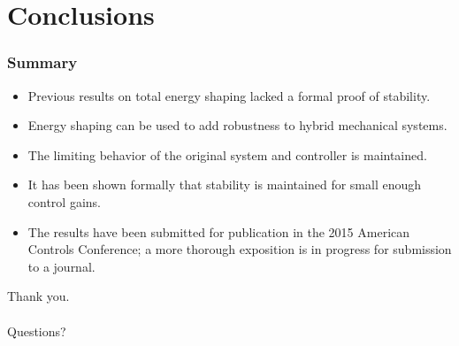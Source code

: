 \section{Conclusions}
\begin{frame}[t]
  \frametitle{Summary}
  \begin{itemize}
  \item Previous results on total energy shaping lacked a formal proof of
    stability.
  \item Energy shaping can be used to add robustness to hybrid mechanical
    systems.
  \item The limiting behavior of the original system and controller is
    maintained.
  \item It has been shown formally that stability is maintained for small enough
    control gains.
  \item The results have been submitted for publication in the 2015 American
    Controls Conference; a more thorough exposition is in progress for
    submission to a journal.
  \end{itemize}
\end{frame}

\begin{frame}
  \centering
  \LARGE{Thank you.}\\ \ \\
  \LARGE{Questions?}
\end{frame}
